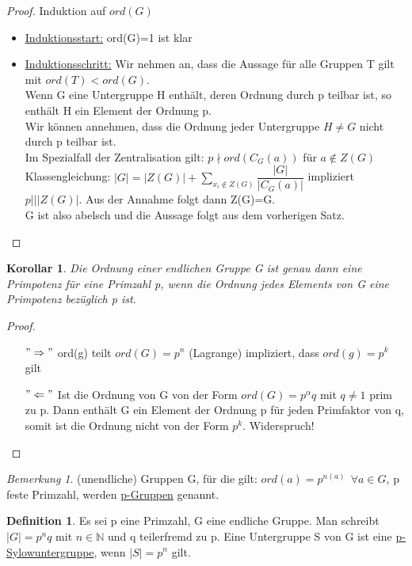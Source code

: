 \documentclass[12pt]{scrartcl}%
\newtheorem{kor}{Korollar}
\theoremstyle{definition}
\newtheorem*{defn}{Definition}
\theoremstyle{remark}
\newtheorem*{nb}{Bemerkung}
\begin{document}
\begin{proof}
Induktion auf $ord(G)$
\begin{itemize}
\item \underline{Induktionsstart:} ord(G)=1 ist klar
\item \underline{Induktionsschritt:} Wir nehmen an, dass die Aussage für alle Gruppen T gilt mit $ord(T)<ord(G)$. \\
Wenn G eine Untergruppe H enthält, deren Ordnung durch p teilbar ist, so enthält H ein Element der Ordnung p. \\
Wir können annehmen, dass die Ordnung jeder Untergruppe $H\neq G$ nicht durch p teilbar ist. \\
Im Spezialfall der Zentralisation gilt: $p \nmid ord(C_{G}(a))$ für $a \notin Z(G)$ \\
Klassengleichung: $|G|=|Z(G)|+\sum_{x_{i}\notin Z(G)}\dfrac{|G|}{|C_{G}(a)|}$ impliziert $p|\mid |Z(G)|$. Aus der Annahme folgt dann Z(G)=G. \\
G ist also abelsch und die Aussage folgt aus dem vorherigen Satz.
\end{itemize}
\end{proof}

\begin{kor}
Die Ordnung einer endlichen Gruppe G ist genau dann eine Primpotenz für eine Primzahl p, wenn die Ordnung jedes Elements von G eine Primpotenz bezüglich p ist.
\end{kor}

\begin{proof}
\begin{itemize}
\item[$"\Rightarrow"$]ord(g) teilt $ord(G)=p^n$ (Lagrange) impliziert, dass $ord(g)=p^k$ gilt
\item[$"\Leftarrow"$]Ist die Ordnung von G von der Form $ord(G)=p^\alpha q$ mit $q\neq 1$ prim zu p. Dann enthält G ein Element der Ordnung p für jeden Primfaktor von q, somit ist die Ordnung nicht von der Form $p^k$. Widerspruch!
\end{itemize}
\end{proof}

\begin{nb}
(unendliche) Gruppen G, für die gilt: $ord(a)=p^{n(a)}\ \ \forall a \in G$, p feste Primzahl, werden \underline{p-Gruppen} genannt.
\end{nb}

\begin{defn}
Es sei p eine Primzahl, G eine endliche Gruppe. Man schreibt $|G|=p^n q$ mit $n \in \mathbb{N}$ und q teilerfremd zu p. Eine Untergruppe S von G ist eine \underline{p-Sylowuntergruppe}, wenn $|S|=p^n$ gilt.
\end{defn}
\end{document}

